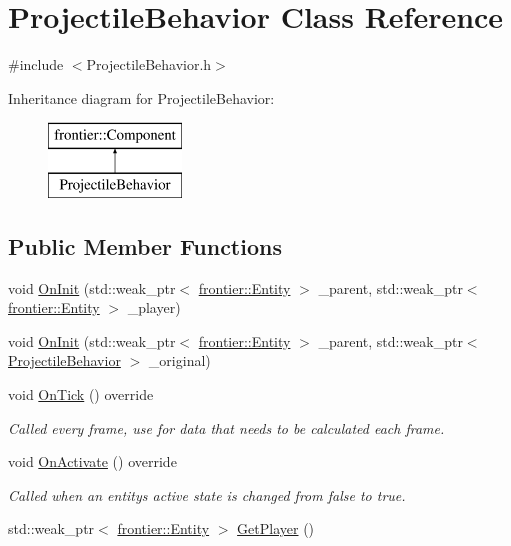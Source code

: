 \hypertarget{class_projectile_behavior}{}\section{Projectile\+Behavior Class Reference}
\label{class_projectile_behavior}


{\ttfamily \#include $<$Projectile\+Behavior.\+h$>$}

Inheritance diagram for Projectile\+Behavior\+:\begin{figure}[H]
\begin{center}
\leavevmode
\includegraphics[height=2.000000cm]{class_projectile_behavior}
\end{center}
\end{figure}
\subsection*{Public Member Functions}
\begin{DoxyCompactItemize}
\item 
void \hyperlink{class_projectile_behavior_ab8caa701affecc1eaddb4bdc17152c23}{On\+Init} (std\+::weak\+\_\+ptr$<$ \hyperlink{classfrontier_1_1_entity}{frontier\+::\+Entity} $>$ \+\_\+parent, std\+::weak\+\_\+ptr$<$ \hyperlink{classfrontier_1_1_entity}{frontier\+::\+Entity} $>$ \+\_\+player)
\item 
void \hyperlink{class_projectile_behavior_a5e356eb4a161e7784c50b14ba39d98d1}{On\+Init} (std\+::weak\+\_\+ptr$<$ \hyperlink{classfrontier_1_1_entity}{frontier\+::\+Entity} $>$ \+\_\+parent, std\+::weak\+\_\+ptr$<$ \hyperlink{class_projectile_behavior}{Projectile\+Behavior} $>$ \+\_\+original)
\item 
void \hyperlink{class_projectile_behavior_a7756651ba998e7f3c0abcafcf25796ae}{On\+Tick} () override
\begin{DoxyCompactList}\small\item\em Called every frame, use for data that needs to be calculated each frame. \end{DoxyCompactList}\item 
void \hyperlink{class_projectile_behavior_aa01c813e541f6069d7ca9c69848ca0a6}{On\+Activate} () override
\begin{DoxyCompactList}\small\item\em Called when an entity\textquotesingle{}s active state is changed from false to true. \end{DoxyCompactList}\item 
std\+::weak\+\_\+ptr$<$ \hyperlink{classfrontier_1_1_entity}{frontier\+::\+Entity} $>$ \hyperlink{class_projectile_behavior_ac0f47feec11bc48291c1d8721efe5bd8}{Get\+Player} ()
\end{DoxyCompactItemize}
